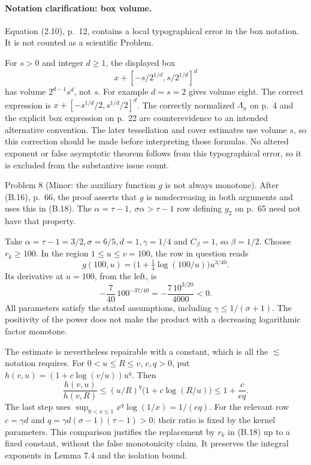 \documentclass[10pt]{article}
\begin{document}
\paragraph*{Notation clarification: box volume.}\mbox{}\par
Equation (2.10), p. 12, contains a local typographical error in the box notation. It is not counted as a scientific Problem.\par
For \(s>0\) and integer \(d\geq1\), the displayed box \[x+[-s/2^{1/d},s/2^{1/d}]^d\] has volume \(2^{d-1}s^d\), not \(s\). For example \(d=s=2\) gives volume eight. The correct expression is \(x+[-s^{1/d}/2,s^{1/d}/2]^d\). The correctly normalized \(\Lambda_n\) on p. 4 and the explicit box expression on p. 22 are counterevidence to an intended alternative convention. The later tessellation and cover estimates use volume \(s\), so this correction should be made before interpreting those formulas. No altered exponent or false asymptotic theorem follows from this typographical error, so it is excluded from the substantive issue count.\par
Problem 8 (Minor: the auxiliary function \(g\) is not always monotone).  After (B.16), p. 66, the proof asserts that \(g\) is nondecreasing in both arguments and uses this in (B.18). The \(\alpha=\tau-1,\ \sigma\alpha>\tau-1\) row defining \(g_2\) on p. 65 need not have that property.\par
Take \(\alpha=\tau-1=3/2,\sigma=6/5,d=1,\gamma=1/4\) and \(C_\beta=1\), so \(\beta=1/2\). Choose \(r_k\geq100\). In the region \(1\leq u\leq v=100\), the row in question reads \[g(100,u)=\bigl(1+\tfrac14\log(100/u)\bigr)u^{3/40}.\] Its derivative at \(u=100\), from the left, is \[-\frac{7}{40}\,100^{-37/40}
 =-\frac{7\,10^{3/20}}{4000}<0.\] All parameters satisfy the stated assumptions, including \(\gamma\leq1/(\sigma+1)\). The positivity of the power does not make the product with a decreasing logarithmic factor monotone.\par
The estimate is nevertheless repairable with a constant, which is all the \(\lesssim\) notation requires. For \(0<u\leq R\leq v\), \(c,q>0\), put \(h(v,u)=(1+c\log(v/u))u^q\). Then \[\frac{h(v,u)}{h(v,R)}
 \leq (u/R)^q\bigl(1+c\log(R/u)\bigr)
 \leq 1+\frac{c}{e q}.\] The last step uses \(\sup_{0<x\leq1}x^q\log(1/x)=1/(eq)\). For the relevant row \(c=\gamma d\) and \(q=\gamma d(\sigma-1)(\tau-1)>0\); their ratio is fixed by the kernel parameters. This comparison justifies the replacement by \(r_k\) in (B.18) up to a fixed constant, without the false monotonicity claim. It preserves the integral exponents in Lemma 7.4 and the isolation bound.\par
\end{document}
